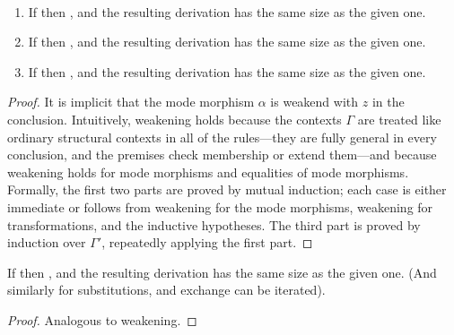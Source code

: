 \begin{lemma} ~ %
\begin{enumerate}
\item If  then
, and the resulting
derivation has the same size as the given one.  
\item If  then
, and the resulting
derivation has the same size as the given one.  
\item If  then
, and the resulting
derivation has the same size as the given one.  
\end{enumerate}
\end{lemma}
\begin{proof}
It is implicit that the mode morphism $\alpha$ is weakend with $z$ in
the conclusion.  Intuitively, weakening holds because the contexts
$\Gamma$ are treated like ordinary structural contexts in all of the
rules---they are fully general in every conclusion, and the premises
check membership or extend them---and because weakening holds for mode
morphisms and equalities of mode morphisms.  Formally, the first two
parts are proved by mutual induction; each case is either immediate
or follows from weakening for the mode morphisms, weakening for
transformations, and the inductive hypotheses.  The third
part is proved by induction over $\Gamma'$, repeatedly applying the
first part.  
\end{proof}

\begin{lemma} %
If  then
, and the resulting derivation
has the same size as the given one.  (And similarly for substitutions,
and exchange can be iterated).  
\end{lemma}
\begin{proof} Analogous to weakening.  
\end{proof}

